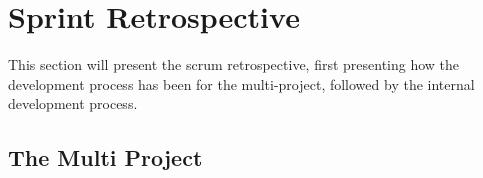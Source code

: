 \section{Sprint Retrospective}

This section will present the scrum retrospective, first presenting how the development process has been for the multi-project, followed by the internal development process.

\subsection*{The Multi Project}

